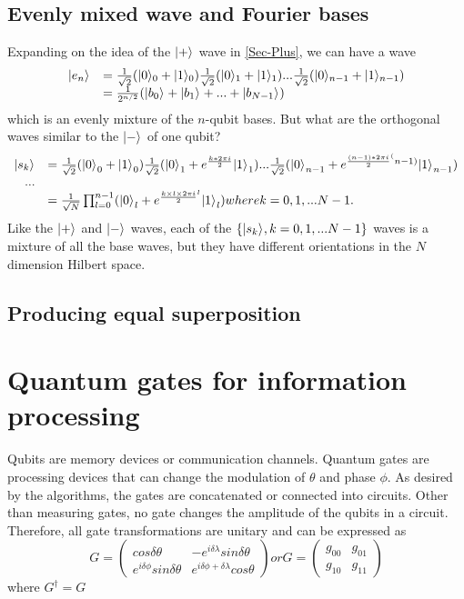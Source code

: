 \documentclass[oneside, letter, 12pt]{book}
\begin{document}
\subsection{Evenly mixed wave and Fourier bases}
Expanding on the idea of the $\keta{+}$ wave in \ref{Sec-Plus}, we can have a wave
\begin{equation}
\begin{array}{rl}
    \keta{e_n} &= \frac 1 {\sqrt{2}} (\keta[0]{0}+\keta[0]{1}) \frac 1 {\sqrt{2}} (\keta[1]{0}+\keta[1]{1})
    ... \frac 1 {\sqrt{2}} (\keta[n-1]{0}+\keta[n-1]{1}) \\
    &= \frac 1 {2^{n/2}} (\keta{b_0}+\keta{b_1}+...+\keta{b_{N-1}})
 \end{array}
\end{equation}
which is an evenly mixture of the $n$-qubit bases. But what are the orthogonal waves similar to the $\keta{-}$ of one qubit?
\begin{equation}
\begin{array}{rl}
\keta{s_k} &= \frac 1 {\sqrt{2}} ({\keta{0}}_0+{\keta{1}}_0)
    \frac 1 {\sqrt{2}} ({\keta{0}}_1+e^{\frac {k*2 \pi i} 2}{\keta{1}}_1)
    ...  \frac 1 {\sqrt{2}} ({\keta{0}}_{n-1}+e^{\frac {(n-1)*2\pi i} 2^(n-1)}{\keta{1}}_{n-1}) \\
    ... \\
    &= \frac 1 {\sqrt{N}} \prod^{n-1}_{l=0} ({\keta{0}}_l+e^{\frac {k\times l \times 2\pi i} 2^l}{\keta{1}}_l) where k=0, 1, ...N-1.
\end{array}
\end{equation}
Like the $\keta{+}$ and $\keta{-}$ waves, each of the $\{\keta{s_k}, k=0, 1, ... N-1\}$ waves is a mixture of all the base waves, but they have different orientations in the $N$ dimension Hilbert space.

\subsection{Producing equal superposition}

\section{Quantum gates for information processing}
Qubits are memory devices or communication channels. Quantum gates are processing devices that can change the modulation of $\theta$ and phase $\phi$. As desired by the algorithms, the gates are concatenated or connected into circuits. Other than measuring gates, no gate changes the amplitude of the qubits in a circuit. Therefore, all gate transformations are unitary and can be expressed as
\begin{equation}
G=
    \begin{pmatrix}
        cos\delta \theta & -e^{i\delta \lambda} sin\delta \theta \\
        e^{i \delta \phi} sin\delta \theta & e^{i \delta \phi+ \delta \lambda} cos\theta 
    \end{pmatrix} or
G=   \begin{pmatrix}
        g_{00} & g_{01} \\
        g_{10} & g_{11} 
    \end{pmatrix}
\end{equation}
where $G^\dagger = G$
\end{document}

